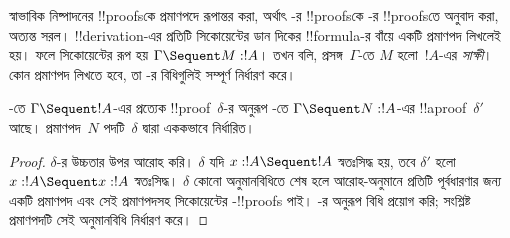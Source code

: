 \documentclass[../../../include/open-logic-section]{subfiles}
\begin{document}


স্বাভাবিক নিষ্পাদনের !!{proof}sকে প্রমাণপদে
রূপান্তর করা, অর্থাৎ -র !!{proof}sকে
-র !!{proof}sতে অনুবাদ করা,
অত্যন্ত সরল। !!{derivation}-এর প্রতিটি
সিকোয়েন্টের ডান দিকের !!{formula}-র
বাঁয়ে একটি প্রমাণপদ লিখলেই হয়। ফলে
সিকোয়েন্টের রূপ হয় $\Gamma \Sequent M :
!A$। তখন বলি, প্রসঙ্গ~$\Gamma$-তে
$M$ হলো~$!A$-এর \emph{সাক্ষী}।
কোন প্রমাণপদ লিখতে হবে, তা
-র বিধিগুলিই সম্পূর্ণ
নির্ধারণ করে।

\begin{prop}
-তে $\Gamma \Sequent !A$-এর
প্রত্যেক !!{proof}~$\delta$-র অনুরূপ
-তে $\Gamma \Sequent N : !A$-এর
!!a{proof}~$\delta'$ আছে। প্রমাণপদ~$N$
পদটি~$\delta$ দ্বারা এককভাবে নির্ধারিত।
\end{prop}

\begin{proof}
$\delta$-র উচ্চতার উপর আরোহ করি।
$\delta$ যদি $x:!A \Sequent !A$
স্বতঃসিদ্ধ হয়, তবে $\delta'$ হলো
$x:!A \Sequent x:!A$ স্বতঃসিদ্ধ।
$\delta$ কোনো অনুমানবিধিতে শেষ হলে
আরোহ-অনুমানে প্রতিটি পূর্বধারণার
জন্য একটি প্রমাণপদ এবং সেই প্রমাণপদসহ
সিকোয়েন্টের -!!{proof}s
পাই। -র অনুরূপ বিধি
প্রয়োগ করি; সংশ্লিষ্ট প্রমাণপদটি
সেই অনুমানবিধি নির্ধারণ করে।
\end{proof}
\end{document}
